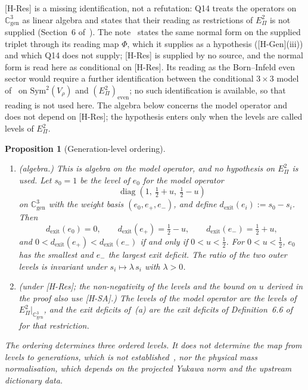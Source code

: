 \documentclass[11pt]{article}
\newtheorem{proposition}{Proposition}
\theoremstyle{definition}
\theoremstyle{remark}
\newcommand{\Cgen}{\mathbb{C}^{3}_{\mathrm{gen}}}
\newcommand{\Epi}{E_{\Pi}}
\newcommand{\Sym}{\mathrm{Sym}}
\newcommand{\diag}{\operatorname{diag}}
\begin{document}
    [H-Res] is a missing identification, not a refutation: Q14 treats the operators on $\Cgen$ as linear algebra and
    states
    that their reading as restrictions of $\Epi^{2}$ is not supplied (Section~6 of~\cite{Beau2026q14}).
    The note~\cite{Beau2026prs} states the same normal form on the supplied triplet through its reading map $\Phi$,
    which it supplies as a hypothesis ([H-Gen](iii)) and which Q14 does not supply; [H-Res] is supplied by no source,
    and the normal form is read here as conditional on [H-Res].
    Its reading as the Born--Infeld even sector would require a further identification between the
    conditional $3\times3$ model of~\cite{Beau2026a34} on $\Sym^2(V_\rho)$ and
    $(E_\Pi^2)_{\mathrm{even}}$; no such identification is available, so that reading is not used
    here.
    The algebra below concerns the model operator and does not depend on [H-Res]; the hypothesis enters only when the
    levels are called levels of $\Epi^{2}$.

    \begin{proposition}[Generation-level ordering]
      \label{prop:generation-level-assignment}
      \begin{enumerate}
        \item[\emph{(a)}] \emph{(algebra.)}
        This is algebra on the model operator, and no hypothesis on $\Epi^{2}$ is used.
        Let $s_{0} = 1$ be the level of $e_{0}$ for the model operator
        \[
          \diag\!\left(1,\ \tfrac12 + u,\ \tfrac12 - u\right)
        \]
        on $\Cgen$ with the weight basis $(e_{0}, e_{+}, e_{-})$, and define
        $d_{\mathrm{exit}}(e_{i}) := s_{0} - s_{i}$.
        Then
        \[
          d_{\mathrm{exit}}(e_{0}) = 0,
          \qquad
          d_{\mathrm{exit}}(e_{+}) = \tfrac12 - u,
          \qquad
          d_{\mathrm{exit}}(e_{-}) = \tfrac12 + u,
        \]
        and $0 < d_{\mathrm{exit}}(e_{+}) < d_{\mathrm{exit}}(e_{-})$ if and only if $0 < u < \tfrac12$.
        For $0 < u < \tfrac12$, $e_{0}$ has the smallest and $e_{-}$ the largest exit deficit.
        The ratio of the two outer levels is invariant under $s_{i} \mapsto \lambda\,s_{i}$ with $\lambda > 0$.
        \item[\emph{(b)}] \emph{(under [H-Res]; the non-negativity of the levels and the bound on $u$ derived in the
        proof also use [H-SA].)}
        The levels of the model operator are the levels of $\Epi^{2}|_{\Cgen}$, and the exit deficits of~(a) are the
        exit deficits of Definition~6.6 of~\cite{Beau2026q14} for that restriction.
      \end{enumerate}
      The ordering determines three ordered levels.
      It does not determine the map from levels to generations, which is not established~\cite{Beau2026q14}, nor the
      physical mass normalisation, which depends on the projected Yukawa norm and the upstream dictionary data.
    \end{proposition}
\end{document}
